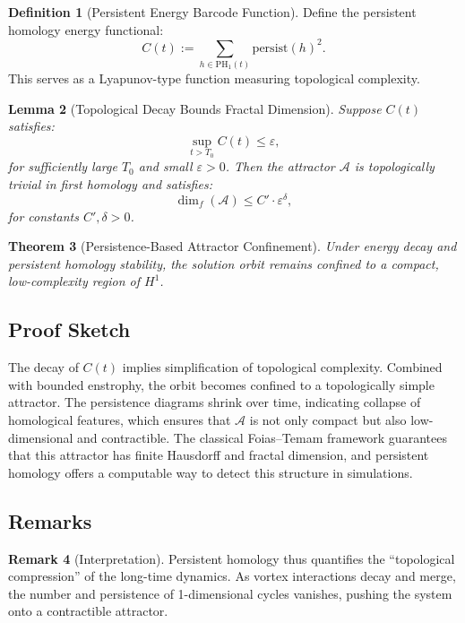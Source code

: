 \documentclass[11pt]{article}
\newtheorem{theorem}{Theorem}[section]
\newtheorem{lemma}[theorem]{Lemma}
\theoremstyle{definition}
\newtheorem{definition}[theorem]{Definition}
\newtheorem{remark}[theorem]{Remark}
\begin{document}
\begin{definition}[Persistent Energy Barcode Function]
Define the persistent homology energy functional:
\[
C(t) := \sum_{h \in \mathrm{PH}_1(t)} \mathrm{persist}(h)^2.
\]
This serves as a Lyapunov-type function measuring topological complexity.
\end{definition}

\begin{lemma}[Topological Decay Bounds Fractal Dimension]
Suppose $C(t)$ satisfies:
\[
\sup_{t > T_0} C(t) \leq \varepsilon,
\]
for sufficiently large $T_0$ and small $\varepsilon > 0$. Then the attractor $\mathcal{A}$ is topologically trivial in first homology and satisfies:
\[
\dim_f(\mathcal{A}) \leq C' \cdot \varepsilon^\delta,
\]
for constants $C', \delta > 0$.
\end{lemma}

\begin{theorem}[Persistence-Based Attractor Confinement]
Under energy decay and persistent homology stability, the solution orbit remains confined to a compact, low-complexity region of $H^1$.
\end{theorem}

\subsection*{Proof Sketch}
The decay of $C(t)$ implies simplification of topological complexity. Combined with bounded enstrophy, the orbit becomes confined to a topologically simple attractor. The persistence diagrams shrink over time, indicating collapse of homological features, which ensures that $\mathcal{A}$ is not only compact but also low-dimensional and contractible. The classical Foias--Temam framework guarantees that this attractor has finite Hausdorff and fractal dimension, and persistent homology offers a computable way to detect this structure in simulations.

\subsection*{Remarks}

\begin{remark}[Interpretation]
Persistent homology thus quantifies the “topological compression” of the long-time dynamics. As vortex interactions decay and merge, the number and persistence of 1-dimensional cycles vanishes, pushing the system onto a contractible attractor.
\end{remark}
\end{document}
